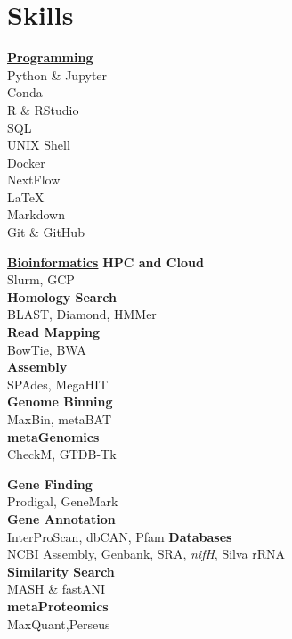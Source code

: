 \documentclass[letterpaper]{twentysecondcv3} %
\begin{document}
\makeprofile %
 

\section{Skills}
\setlength\multicolsep{0pt}
\begin{multicols}{4}
\textbf{\underline{Programming}}\\
Python \& Jupyter\\
Conda\\%
R \& RStudio\\
SQL\\
UNIX Shell\\
Docker\\
NextFlow\\
\LaTeX\\
Markdown\\
Git \& GitHub\columnbreak

\textbf{\underline{Bioinformatics}}
\textbf{HPC and Cloud}\\
Slurm, GCP\\
\textbf{Homology Search}\\
BLAST, Diamond, HMMer\\
\textbf{Read Mapping}\\
BowTie, BWA\\%
\textbf{Assembly}\\
SPAdes, MegaHIT\\
\textbf{Genome Binning}\\
MaxBin, metaBAT\\
\textbf{metaGenomics}\\
CheckM, GTDB-Tk\columnbreak

\textbf{Gene Finding}\\
Prodigal, GeneMark\\
\textbf{Gene Annotation}\\
InterProScan, dbCAN, Pfam
\textbf{Databases}\\
NCBI Assembly, Genbank, SRA, \emph{nifH}, Silva rRNA\\
\textbf{Similarity Search}\\
MASH \& fastANI\\
\textbf{metaProteomics}\\
MaxQuant,Perseus\columnbreak


\end{multicols}
\end{document}
